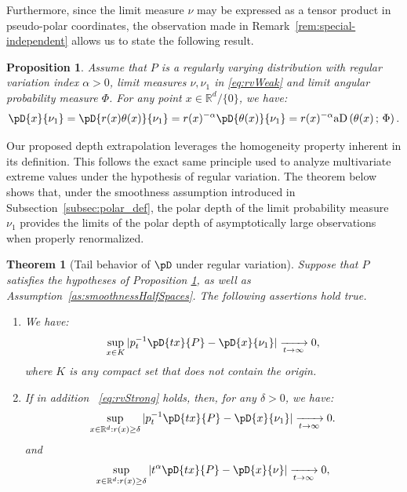 \documentclass{article}
\numberwithin{equation}{section}
\newtheorem{theorem}{Theorem}[section]
\newtheorem{proposition}{Proposition}[section]
\newcommand{\R}{\mathbb{R}}
\newcommand{\rset}{\mathbb{R}}
\newcommand{\coD}[2]{\pD{#1}{#2}}
\newcommand{\aD}[2]{{\mathrm{aD}}\left({#1}\,;\,{#2}\right)}
\begin{document}
 Furthermore, since %
the limit measure $\nu$ may be expressed as a tensor product in pseudo-polar coordinates, the
observation made in Remark~\ref{rem:special-independent} allows us to
state the following result.
\begin{proposition}\label{prop:cod_nu}
    Assume that $P$ is a regularly varying distribution with regular variation
    index $\alpha>0$, limit measures $\nu,\nu_1$ in \eqref{eq:rvWeak} and limit
    angular probability measure $\Phi$. For any point
    \(x\in\R^d/\{0\}\), we have:
    \begin{equation}\label{eq:relationship_ad_limit_cod_exponent}
        \coD{x}{\nu_1} = \coD{r(x)\theta(x)}{\nu_1} =
        r(x)^{-\alpha}\coD{\theta(x)}{\nu_1} =
        r(x)^{-\alpha}\aD{\theta(x)}{\Phi}.
    \end{equation}
\end{proposition}
Our proposed depth extrapolation leverages the homogeneity property inherent in its definition. This follows the exact same principle used to analyze multivariate extreme values under the hypothesis of regular variation.  The theorem below shows that, under the smoothness
assumption introduced in Subsection~\ref{subsec:polar_def}, the polar
depth of the limit probability measure $\nu_1$ provides the limits of
the polar depth of asymptotically large observations when properly renormalized.

\begin{theorem}[Tail behavior of $\pD$ under regular
    variation]\label{theo:tailscoD}
    Suppose that $P$ satisfies the hypotheses of Proposition
    \ref{prop:cod_nu}, as well as
    Assumption~\ref{as:smoothnessHalfSpaces}. The following
    assertions hold true.
    \begin{enumerate}
        \item We have:
            \begin{equation}\label{eq:uniform_limit_extremes}
                \sup_{x \in K} | p_t^{-1}\coD{tx}{P} -
                \coD{x}{\nu_1} |\xrightarrow[t\to\infty]{} 0,
            \end{equation}
            where \(K\) is any compact set that does not contain the origin.
        \item If in addition ~\eqref{eq:rvStrong} holds, then, for
            any $\delta>0$, we have:
            \begin{equation}\label{eq:uniform_limit_extremes_constant_l_with_b}
                \sup_{x \in \rset^d: r(x)\ge \delta} | p_t^{-1}\coD{tx}{P} -
                \coD{x}{\nu_1} |\xrightarrow[t\to\infty]{} 0.
            \end{equation}
            and
            \begin{equation}\label{eq:uniform_limit_extremes_constant_l}
                \sup_{x \in \rset^d: r(x)\ge \delta} | t^{\alpha}\coD{tx}{P} -
                \coD{x}{\nu} |\xrightarrow[t\to\infty]{} 0,
            \end{equation}
    \end{enumerate}
\end{theorem}
\end{document}
